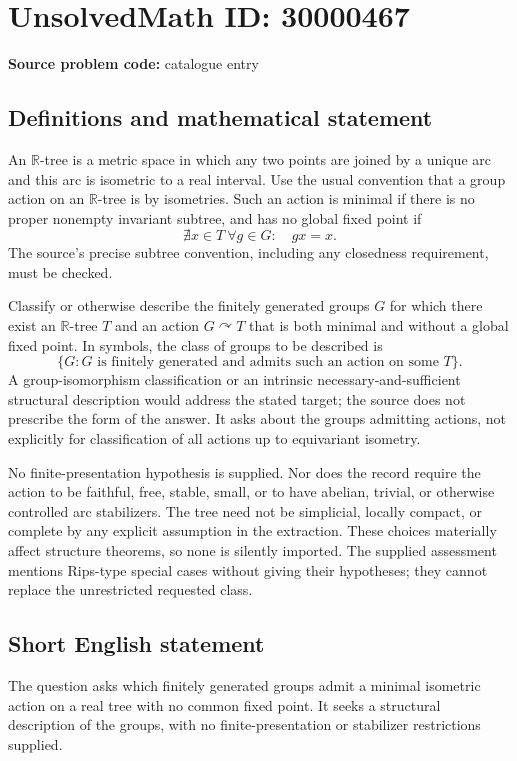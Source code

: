 \documentclass[11pt]{article}
\newcommand{\R}{\mathbb{R}}
\begin{document}
\section*{UnsolvedMath ID: 30000467}
\textbf{Source problem code:} catalogue entry
\subsection{Definitions and mathematical statement}
An $\R$-tree is a metric space in which any two points are joined by a unique arc and this arc is isometric to a real interval. Use the usual convention that a group action on an $\R$-tree is by isometries. Such an action is minimal if there is no proper nonempty invariant subtree, and has no global fixed point if
\[
 \nexists x\in T\ \forall g\in G:\quad gx=x.
\]
The source's precise subtree convention, including any closedness requirement, must be checked.

Classify or otherwise describe the finitely generated groups $G$ for which there exist an $\R$-tree $T$ and an action $G\curvearrowright T$ that is both minimal and without a global fixed point. In symbols, the class of groups to be described is
\[
 \{G:G\text{ is finitely generated and admits such an action on some }T\}.
\]
A group-isomorphism classification or an intrinsic necessary-and-sufficient structural description would address the stated target; the source does not prescribe the form of the answer. It asks about the groups admitting actions, not explicitly for classification of all actions up to equivariant isometry.

No finite-presentation hypothesis is supplied. Nor does the record require the action to be faithful, free, stable, small, or to have abelian, trivial, or otherwise controlled arc stabilizers. The tree need not be simplicial, locally compact, or complete by any explicit assumption in the extraction. These choices materially affect structure theorems, so none is silently imported. The supplied assessment mentions Rips-type special cases without giving their hypotheses; they cannot replace the unrestricted requested class.
\subsection{Short English statement}
The question asks which finitely generated groups admit a minimal isometric action on a real tree with no common fixed point. It seeks a structural description of the groups, with no finite-presentation or stabilizer restrictions supplied.
\end{document}
